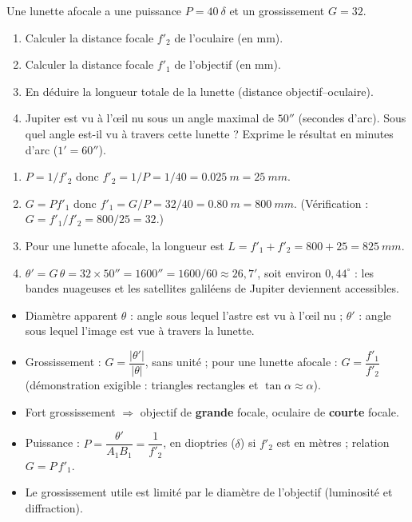 \documentclass[11pt]{article}
\begin{document}
\begin{exercice}
Une lunette afocale a une puissance $P = 40~\delta$ et un grossissement $G = 32$.
\begin{enumerate}
\item Calculer la distance focale $f'_2$ de l'oculaire (en mm).
\item Calculer la distance focale $f'_1$ de l'objectif (en mm).
\item En déduire la longueur totale de la lunette (distance objectif--oculaire).
\item Jupiter est vu à l'œil nu sous un angle maximal de $50''$ (secondes d'arc). Sous quel angle est-il vu à travers cette lunette ? Exprime le résultat en minutes d'arc ($1' = 60''$).
\end{enumerate}
\end{exercice}

\begin{corrige}[Exercice]
\begin{enumerate}
\item $P = 1/f'_2$ donc $f'_2 = 1/P = 1/40 = \SI{0,025}{m} = \SI{25}{mm}$.
\item $G = Pf'_1$ donc $f'_1 = G/P = 32/40 = \SI{0,80}{m} = \SI{800}{mm}$. (Vérification : $G = f'_1/f'_2 = 800/25 = 32$.)
\item Pour une lunette afocale, la longueur est $L = f'_1 + f'_2 = 800 + 25 = \SI{825}{mm}$.
\item $\theta' = G\,\theta = 32 \times 50'' = 1600'' = 1600/60 \approx 26,7'$, soit environ $0,44^{\circ}$ : les bandes nuageuses et les satellites galiléens de Jupiter deviennent accessibles.
\end{enumerate}
\end{corrige}

\begin{aretenir}
\begin{itemize}
\item Diamètre apparent $\theta$ : angle sous lequel l'astre est vu à l'œil nu ; $\theta'$ : angle sous lequel l'image est vue à travers la lunette.
\item Grossissement : $G = \dfrac{|\theta'|}{|\theta|}$, sans unité ; pour une lunette afocale : $G = \dfrac{f'_1}{f'_2}$ (démonstration exigible : triangles rectangles et $\tan\alpha \approx \alpha$).
\item Fort grossissement $\Rightarrow$ objectif de \textbf{grande} focale, oculaire de \textbf{courte} focale.
\item Puissance : $P = \dfrac{\theta'}{A_1B_1} = \dfrac{1}{f'_2}$, en dioptries ($\delta$) si $f'_2$ est en mètres ; relation $G = P\,f'_1$.
\item Le grossissement utile est limité par le diamètre de l'objectif (luminosité et diffraction).
\end{itemize}
\end{aretenir}
\end{document}
